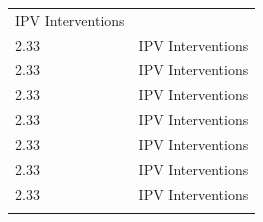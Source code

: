 \documentclass[]{tufte-handout}
\begin{document}
\begin{longtable}[]{@{}ll@{}}
\begin{minipage}[t]{0.26\columnwidth}
IPV Interventions\strut
\end{minipage}\tabularnewline
\begin{minipage}[t]{0.09\columnwidth}\raggedright\strut
2.33\strut
\end{minipage} & \begin{minipage}[t]{0.26\columnwidth}\raggedright\strut
IPV Interventions\strut
\end{minipage}\tabularnewline
\begin{minipage}[t]{0.09\columnwidth}\raggedright\strut
2.33\strut
\end{minipage} & \begin{minipage}[t]{0.26\columnwidth}\raggedright\strut
IPV Interventions\strut
\end{minipage}\tabularnewline
\begin{minipage}[t]{0.09\columnwidth}\raggedright\strut
2.33\strut
\end{minipage} & \begin{minipage}[t]{0.26\columnwidth}\raggedright\strut
IPV Interventions\strut
\end{minipage}\tabularnewline
\begin{minipage}[t]{0.09\columnwidth}\raggedright\strut
2.33\strut
\end{minipage} & \begin{minipage}[t]{0.26\columnwidth}\raggedright\strut
IPV Interventions\strut
\end{minipage}\tabularnewline
\begin{minipage}[t]{0.09\columnwidth}\raggedright\strut
2.33\strut
\end{minipage} & \begin{minipage}[t]{0.26\columnwidth}\raggedright\strut
IPV Interventions\strut
\end{minipage}\tabularnewline
\begin{minipage}[t]{0.09\columnwidth}\raggedright\strut
2.33\strut
\end{minipage} & \begin{minipage}[t]{0.26\columnwidth}\raggedright\strut
IPV Interventions\strut
\end{minipage}\tabularnewline
\begin{minipage}[t]{0.09\columnwidth}\raggedright\strut
2.33\strut
\end{minipage} & \begin{minipage}[t]{0.26\columnwidth}\raggedright\strut
IPV Interventions\strut
\end{minipage}\tabularnewline
\begin{minipage}[t]{0.09\columnwidth}\raggedright\strut

\end{minipage}
\end{longtable}
\end{document}
